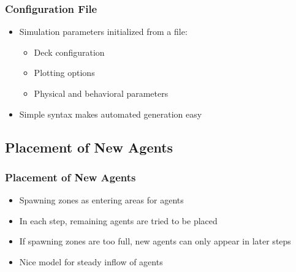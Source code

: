 \documentclass{beamer}
\begin{document}
\begin{frame}
	\frametitle{Configuration File}
	\begin{itemize}
		\item Simulation parameters initialized from a file:
			\begin{itemize}
				\item Deck configuration
				\item Plotting options
				\item Physical and behavioral parameters
			\end{itemize}
		\item Simple syntax makes automated generation easy
	\end{itemize}
\end{frame}

\subsection{Placement of New Agents}
\begin{frame}
	\frametitle{Placement of New Agents}
	\begin{itemize}
		\item Spawning zones as entering areas for agents
		\item In each step, remaining agents are tried to be placed
		\item If spawning zones are too full, new agents can only appear in later steps
		\item Nice model for steady inflow of agents
	\end{itemize}
\end{frame}

\end{document}
